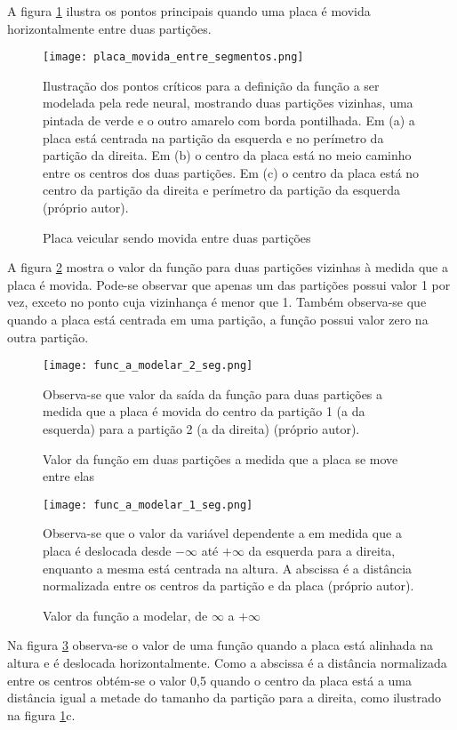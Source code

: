 A figura \ref{fig:placa_movida_entre_segmentos} ilustra os pontos principais
quando uma placa é movida horizontalmente entre duas partições.

\begin{figure}[!htb]
	\centering
	\texttt{[image: placa\_movida\_entre\_segmentos.png]}
	\caption{Placa veicular sendo movida entre duas partições}
	\label{fig:placa_movida_entre_segmentos}
	Ilustração dos pontos críticos para a definição da função a ser modelada
	pela rede neural, mostrando duas partições vizinhas, uma pintada de verde e
	o outro amarelo com borda pontilhada. Em (a) a placa está centrada na
	partição da esquerda e no perímetro da partição da direita.
	Em (b) o centro da placa está no meio caminho entre os centros dos duas
	partições. Em (c) o centro da placa está no centro da partição da direita e
	perímetro da partição da esquerda (próprio autor).
\end{figure}

A figura \ref{fig:func_a_modelar_2_seg} mostra o valor da função para
duas partições vizinhas à medida que a placa é movida. Pode-se observar que
apenas um das partições possui valor 1 por vez, exceto no ponto cuja vizinhança
é menor que 1. Também observa-se
que quando a placa está centrada em uma partição, a função possui valor zero
na outra partição.

\begin{figure}[!htb]
	\centering
	\texttt{[image: func\_a\_modelar\_2\_seg.png]}
	\caption{Valor da função em duas partições a medida que a placa se move
	entre elas}
	\label{fig:func_a_modelar_2_seg}
	Observa-se que valor da saída da função para duas partições a medida que a
	placa é movida do centro da partição 1 (a da esquerda) para a partição 2 (a
	da direita) (próprio autor).
\end{figure}

\begin{figure}[!htb]
	\centering
	\texttt{[image: func\_a\_modelar\_1\_seg.png]}
	\caption{Valor da função a modelar, de $\infty$ a $+\infty$}
	\label{fig:func_a_modelar_1_seg}
	Observa-se que o valor da variável dependente a em medida que a placa
	é deslocada desde $-\infty$ até $+\infty$ da esquerda para a direita,
	enquanto a mesma está centrada na altura. A abscissa é a distância
	normalizada entre os centros da partição e da placa (próprio autor).
\end{figure}

Na figura \ref{fig:func_a_modelar_1_seg} observa-se o valor de uma função
quando a placa está alinhada na altura e é deslocada horizontalmente. Como
a abscissa é a distância normalizada entre os centros obtém-se o valor 0,5
quando o centro da placa está a uma distância igual a metade do tamanho da
partição para a direita, como ilustrado na figura
\ref{fig:placa_movida_entre_segmentos}c.

